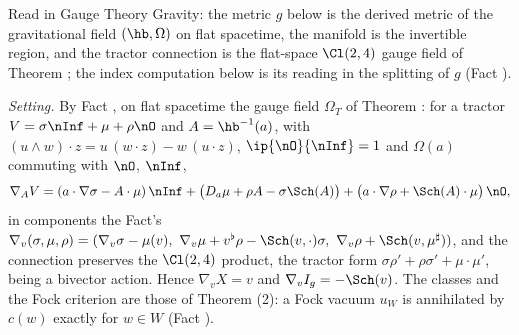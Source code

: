 Read in Gauge Theory Gravity: the metric $g$ below is the derived metric of the gravitational field $(\hb, \Omega)$ on flat spacetime, the manifold is the invertible region, and the tractor connection is the flat-space $\Cl(2,4)$ gauge field of Theorem ; the index computation below is its reading in the splitting of $g$ (Fact ).

\emph{Setting.} By Fact , on flat spacetime the gauge field $\Omega_{T}$ of Theorem : for a tractor $V = \sigma\nInf + \mu + \rho\nO$ and $A = \hb^{-1}(a)$, with $(u\wedge w)\cdot z = u\,(w\cdot z) - w\,(u\cdot z)$, $\ip{\nO}{\nInf} = 1$ and $\Omega(a)$ commuting with $\nO$, $\nInf$,
\[
\nabla_{A}V = (a\cdot\nabla\sigma - A\cdot\mu)\,\nInf + \bigl(D_{a}\mu + \rho A - \sigma\Sch(A)\bigr) + \bigl(a\cdot\nabla\rho + \Sch(A)\cdot\mu\bigr)\,\nO ,
\]
in components the Fact's $\nabla_{v}(\sigma,\mu,\rho) = (\nabla_{v}\sigma - \mu(v),\ \nabla_{v}\mu + v^{\flat}\rho - \Sch(v,\cdot)\sigma,\ \nabla_{v}\rho + \Sch(v,\mu^{\sharp}))$, and the connection preserves the $\Cl(2,4)$ product, the tractor form $\sigma\rho' + \rho\sigma' + \mu\cdot\mu'$, being a bivector action. Hence $\nabla_{v}X = v$ and $\nabla_{v}I_{g} = -\Sch(v)$. The classes and the Fock criterion are those of Theorem (2): a Fock vacuum $u_{W}$ is annihilated by $c(w)$ exactly for $w \in W$ (Fact ).

